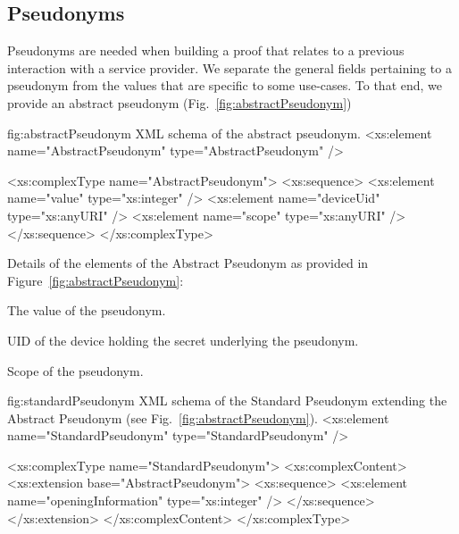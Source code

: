   





\subsection{Pseudonyms}

Pseudonyms are needed when building a proof that relates to a previous interaction with a service provider.
We separate the general fields pertaining to a pseudonym from the values that are specific to some
use-cases.
To that end, we provide an abstract pseudonym (Fig.~\ref{fig:abstractPseudonym})

\begin{xml}
{fig:abstractPseudonym}
{XML schema of the abstract pseudonym.}
<xs:element name="AbstractPseudonym" type="AbstractPseudonym" />

<xs:complexType name="AbstractPseudonym">
  <xs:sequence>
    <xs:element name="value" type="xs:integer" />
    <xs:element name="deviceUid" type="xs:anyURI" />
    <xs:element name="scope" type="xs:anyURI" />
  </xs:sequence>
</xs:complexType>
\end{xml}

\vspace{3pt}\noindent Details of the elements of the Abstract Pseudonym as provided in Figure~\ref{fig:abstractPseudonym}:
\begin{parameter}
The value of the pseudonym.
\end{parameter}
\begin{parameter}
UID of the device holding the secret underlying the pseudonym.
\end{parameter}
\begin{parameter}
Scope of the pseudonym.
\end{parameter}
  

\begin{xml}
{fig:standardPseudonym}
{XML schema of the Standard Pseudonym extending the Abstract Pseudonym (see Fig.~\ref{fig:abstractPseudonym}).}
<xs:element name="StandardPseudonym" type="StandardPseudonym" />

<xs:complexType name="StandardPseudonym">
  <xs:complexContent>
    <xs:extension base="AbstractPseudonym">
      <xs:sequence>
        <xs:element name="openingInformation" type="xs:integer" />
      </xs:sequence>
    </xs:extension>
  </xs:complexContent>
</xs:complexType>
\end{xml}

